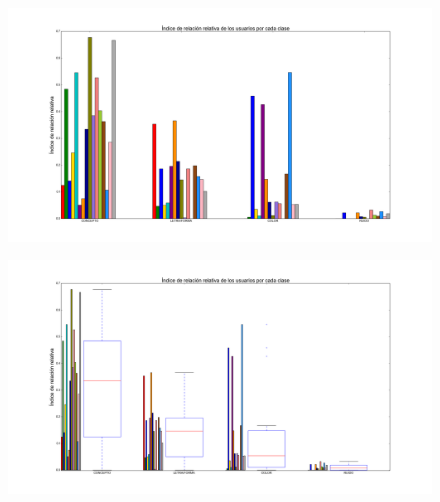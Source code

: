 \documentclass{beamer}
\begin{document}
\begin{frame}

\begin{figure}[h]
 \centering
  \begin{minipage}[c]{1\textwidth}
	\centering	
	\includegraphics[scale=0.23]{irr_uxc.png}
  \end{minipage}
\end{figure}

\end{frame}

\begin{frame}
\begin{figure}[h]
 \centering
  \begin{minipage}[c]{1\textwidth}
	\centering	
	\includegraphics[scale=0.23]{irr_uxc_2.png}
  \end{minipage}
\end{figure}
\end{frame}
\end{document}
